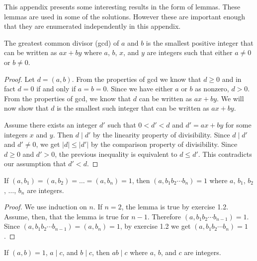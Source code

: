 This appendix presents some interesting results in the form of lemmas.
These lemmas are used in some of the solutions. However these are
important enough that they are enumerated independently in this
appendix.

\begin{lemma}
  The greatest common divisor (gcd) of \( a \) and \( b \) is the
  smallest positive integer that can be written as \( ax + by \) where
  \( a \), \( b \), \( x \), and \( y \) are integers such that either
  \( a \ne 0 \) or \( b \ne 0 \).
\end{lemma}

\begin{proof}
  Let \( d = (a, b) \). From the properties of gcd we know that \( d
  \ge 0 \) and in fact \( d = 0 \) if and only if \( a = b = 0 \).
  Since we have either \( a \) or \( b \) as nonzero, \( d > 0 \).
  From the properties of gcd, we know that \( d \) can be written as
  \( ax + by \). We will now show that \( d \) is the smallest such
  integer that can be written as \( ax + by \).

  Assume there exists an integer \( d' \) such that \( 0 < d' < d \)
  and \( d' = ax + by \) for some integers \( x \) and \( y \). Then
  \( d \mid d' \) by the linearity property of divisibility. Since \(
  d \mid d' \) and \( d' \ne 0 \), we get \( \lvert d \rvert \le
  \lvert d' \rvert \) by the comparison property of divisibility.
  Since \( d \ge 0 \) and \( d' > 0 \), the previous inequality is
  equivalent to \( d \le d' \). This contradicts our assumption that
  \( d' < d \).
\end{proof}


\begin{lemma}
  \label{multi-coprime}
  If \( (a, b_1) = (a, b_2) = \dots = (a, b_n) = 1 \), then \( (a, b_1
  b_2 \cdots b_n) = 1 \) where \( a \), \( b_1 \), \( b_2 \), \( \dots
  \), \( b_n \) are integers.
\end{lemma}

\begin{proof}
  We use induction on \( n \). If \( n = 2 \), the lemma is true by
  exercise 1.2. Assume, then, that the lemma is true for \( n - 1 \).
  Therefore \( (a, b_1 b_2 \cdots b_{n - 1}) = 1 \). Since \( (a, b_1 b_2
  \cdots b_{n - 1}) = (a, b_n) = 1 \), by exercise 1.2 we get \( (a,
  b_1 b_2 \cdots b_n ) = 1 \).
\end{proof}


\begin{lemma}
  If \( (a, b) = 1 \), \( a \mid c \), and \( b \mid c \), then \( ab
  \mid c \) where \( a \), \( b \), and \( c \) are integers.
\end{lemma}

